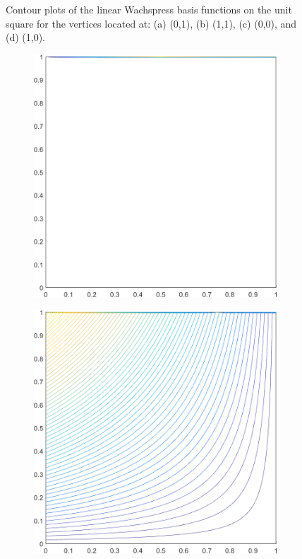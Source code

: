 \begin{figure}
\begin{subfigure}[b]{0.39\textwidth}
		\caption{}
	\end{subfigure}
\caption{Contour plots of the linear Wachspress basis functions on the unit square for the vertices located at: (a) (0,1), (b) (1,1), (c) (0,0), and (d) (1,0).}
\label{fig::2D_WACHSPRESS1_unit_square_basis_functions}
\end{figure}

\begin{figure}
\centering
	\begin{subfigure}[b]{0.39\textwidth}
		\centering
		\includegraphics[width=\textwidth]{figures/sec_BF/deg_square_WACHSPRESS1_contour_b4.png}
		\caption{}
	\end{subfigure}
	\vfill
	\begin{subfigure}[b]{0.39\textwidth}
		\centering
		\includegraphics[width=\textwidth]{figures/sec_BF/deg_square_WACHSPRESS1_contour_b5.png}

\end{subfigure}
\end{figure}
